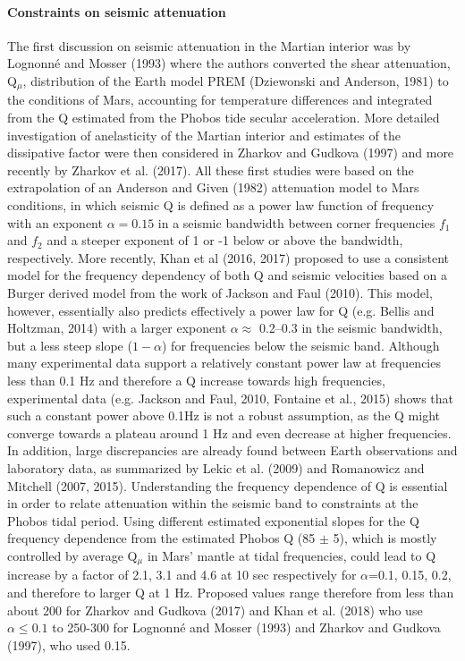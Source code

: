 \paragraph{Constraints on seismic attenuation}
The first discussion on seismic attenuation in the Martian interior was by Lognonn\'{e} and Mosser (1993) where the authors converted the shear attenuation, Q$_{\mu}$, distribution of the Earth model PREM (Dziewonski and Anderson, 1981) to the conditions of Mars, accounting for temperature differences and integrated from the Q estimated from the Phobos tide secular acceleration. More detailed investigation of anelasticity of the Martian interior and estimates of the dissipative factor were then considered in Zharkov and Gudkova (1997) and more recently by Zharkov et al. (2017). All these first studies were based on the extrapolation of an Anderson and Given (1982) attenuation model to Mars conditions, in which seismic Q is defined as a power law function of frequency with an exponent $\alpha=0.15$ in a seismic bandwidth between corner frequencies $f_1$ and $f_2$ and a steeper exponent of 1 or -1 below or above the bandwidth, respectively. More recently, Khan et al (2016, 2017) proposed to use a consistent model for the frequency dependency of both Q and seismic velocities based on a Burger derived model from the work of Jackson and Faul (2010). This model, however, essentially also predicts effectively a power law for Q (e.g. Bellis and Holtzman, 2014) with a larger exponent $\alpha \approx$ 0.2--0.3 in the seismic bandwidth, but a less steep slope ($1-\alpha$) for frequencies below the seismic band.  Although many experimental data support a relatively constant power law at frequencies less than 0.1 Hz and therefore a Q increase towards high frequencies, experimental data (e.g. Jackson and Faul, 2010, Fontaine et al., 2015) shows that such a constant power above 0.1Hz is not a robust assumption, as the Q might converge towards a plateau around 1 Hz and even decrease at higher frequencies.  In addition, large discrepancies are already found between Earth observations and laboratory data, as summarized by Lekic et al. (2009) and Romanowicz and Mitchell (2007, 2015). Understanding the frequency dependence of Q is essential in order to relate attenuation within the seismic band to constraints at the Phobos tidal period.  Using different estimated exponential slopes for the Q frequency dependence from the estimated Phobos Q (85 $\pm$ 5), which is mostly controlled by average Q$_{\mu}$ in Mars' mantle at tidal frequencies, could lead to Q increase by a factor of 2.1, 3.1 and 4.6 at 10 sec respectively for $\alpha$=0.1, 0.15, 0.2, and therefore to larger Q at 1 Hz. Proposed values range therefore from less than about 200 for Zharkov and Gudkova (2017) and Khan et al. (2018) who use $\alpha\leq 0.1$ to 250-300 for Lognonn\'{e} and Mosser (1993) and Zharkov and Gudkova (1997), who used 0.15.

